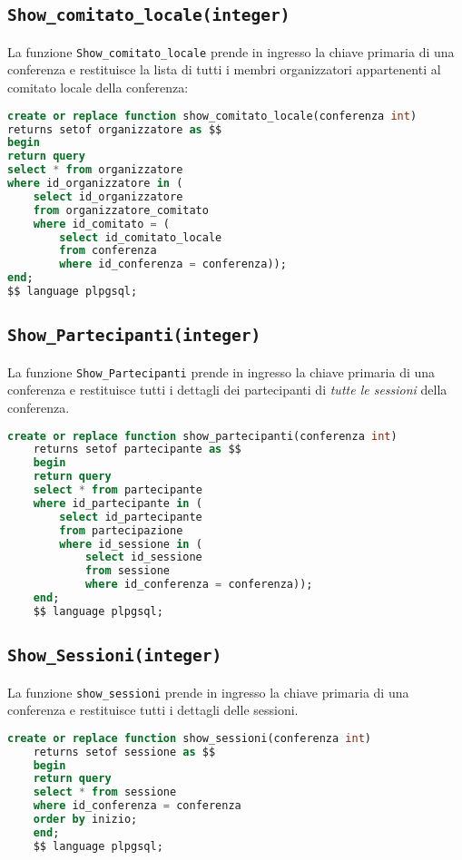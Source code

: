 \subsection{\texttt{Show\_comitato\_locale(integer)}}
La funzione \texttt{Show\_comitato\_locale} prende in ingresso la chiave primaria di una conferenza e restituisce la lista di tutti i membri organizzatori appartenenti al comitato locale della conferenza:
\begin{lstlisting}[language=SQL, style=mystyle]
create or replace function show_comitato_locale(conferenza int)
returns setof organizzatore as $$
begin
return query
select * from organizzatore
where id_organizzatore in (
	select id_organizzatore 
	from organizzatore_comitato
	where id_comitato = (
		select id_comitato_locale 
		from conferenza
		where id_conferenza = conferenza));
end;
$$ language plpgsql;
\end{lstlisting}
\subsection{\texttt{Show\_Partecipanti(integer)}}
La funzione \texttt{Show\_Partecipanti} prende in ingresso la chiave primaria di una conferenza e restituisce tutti i dettagli dei partecipanti di \textit{tutte le sessioni} della conferenza.
\begin{lstlisting}[language=SQL,style=mystyle]
	create or replace function show_partecipanti(conferenza int)
	returns setof partecipante as $$
	begin
	return query
	select * from partecipante
	where id_partecipante in (
		select id_partecipante 
		from partecipazione
		where id_sessione in (
			select id_sessione 
			from sessione
			where id_conferenza = conferenza));
	end;
	$$ language plpgsql;
\end{lstlisting}
\subsection{\texttt{Show\_Sessioni(integer)}}
La funzione \texttt{show\_sessioni} prende in ingresso la chiave primaria di una conferenza e restituisce tutti i dettagli delle sessioni.
\begin{lstlisting}[language=SQL, style=mystyle]
	create or replace function show_sessioni(conferenza int)
	returns setof sessione as $$
	begin
	return query
	select * from sessione
	where id_conferenza = conferenza
	order by inizio;
	end;
	$$ language plpgsql;
\end{lstlisting}
